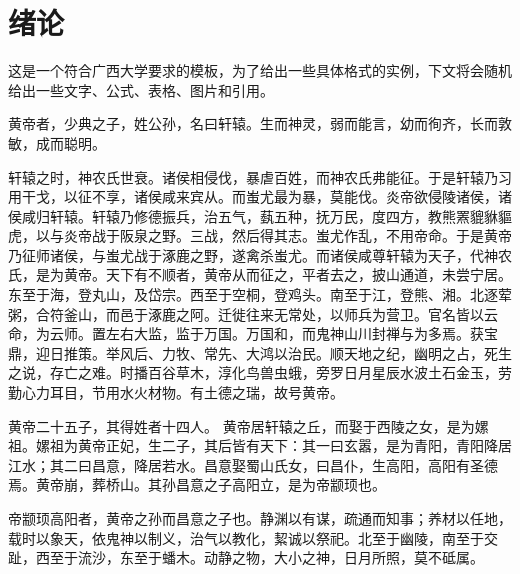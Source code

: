 \documentclass[UTF8,12pt,AutoFakeBold]{ctexart}
\begin{document}
	
	{\hypersetup{colorlinks=true,linkcolor=black}\tableofcontents}
	\newpage
	\setcounter{page}{1} %
	\pagestyle{fancy}%
	\fancyhf{}
	\fancyfoot[C]{\thepage} %
	\section{绪论\label{绪论}}
	这是一个符合广西大学要求的模板，为了给出一些具体格式的实例，下文将会随机给出一些文字、公式、表格、图片和引用\cite{doi:10.1080/00107514.2012.685693,annurev:/content/journals/10.1146/annurev-nucl-102014-022137,GROOM1986323,doi:10.1142/S0217751X20300124}。
	\par
	黄帝者，少典之子，姓公孙，名曰轩辕。生而神灵，弱而能言，幼而徇齐，长而敦敏，成而聪明\cite{HOOFT1974276,PismaZhETF.20.430}。
	\par
	轩辕之时，神农氏世衰。诸侯相侵伐，暴虐百姓，而神农氏弗能征。于是轩辕乃习用干戈，以征不享，诸侯咸来宾从。而蚩尤最为暴，莫能伐。炎帝欲侵陵诸侯，诸侯咸归轩辕。轩辕乃修德振兵，治五气，蓺五种，抚万民，度四方，教熊罴貔貅貙虎，以与炎帝战于阪泉之野。三战，然后得其志。蚩尤作乱，不用帝命。于是黄帝乃征师诸侯，与蚩尤战于涿鹿之野，遂禽杀蚩尤。而诸侯咸尊轩辕为天子\cite{PhysRevLett.33.451}，代神农氏，是为黄帝。天下有不顺者，黄帝从而征之，平者去之，披山通道，未尝宁居。
	东至于海，登丸山，及岱宗。西至于空桐，登鸡头。南至于江，登熊、湘。北逐荤粥，合符釜山，而邑于涿鹿之阿。迁徙往来无常处，以师兵为营卫。官名皆以云命，为云师。置左右大监，监于万国。万国和，而鬼神山川封禅与为多焉。获宝鼎，迎日推策。举风后、力牧、常先、大鸿以治民。顺天地之纪，幽明之占，死生之说，存亡之难。时播百谷草木，淳化鸟兽虫蛾，旁罗日月星辰水波土石金玉，劳勤心力耳目，节用水火材物。有土德之瑞，故号黄帝。
	\par
	黄帝二十五子，其得姓者十四人。
	黄帝居轩辕之丘，而娶于西陵之女，是为嫘祖。嫘祖为黄帝正妃，生二子，其后皆有天下：其一曰玄嚣，是为青阳\cite{STAROBINSKY198099,PhysRevD.23.347}，青阳降居江水；其二曰昌意，降居若水。昌意娶蜀山氏女，曰昌仆，生高阳，高阳有圣德焉。黄帝崩，葬桥山。其孙昌意之子高阳立，是为帝颛顼也。
	\par
	帝颛顼高阳者，黄帝之孙而昌意之子也。静渊以有谋，疏通而知事；养材以任地，载时以象天，依鬼神以制义，治气以教化，絜诚以祭祀。北至于幽陵，南至于交趾，西至于流沙，东至于蟠木。动静之物，大小之神，日月所照，莫不砥属。
\end{document}
